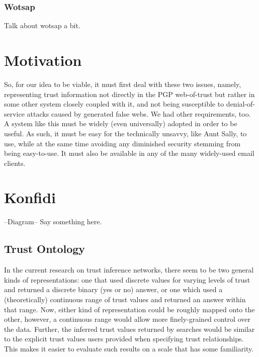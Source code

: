 \documentclass{acm_proc_article-sp}
\begin{document}
\subsubsection{Wotsap}
\label{wotsap}
Talk about wotsap a bit.

\section{Motivation}
So, for our idea to be viable, it must first deal with these two issues, namely, representing trust information not directly in the PGP web-of-trust but rather in some other system closely coupled with it, and not being susceptible to denial-of-service attacks caused by generated false webs. We had other requirements, too. A system like this must be widely (even universally) adopted in order to be useful. As such, it must be easy for the technically unsavvy, like Aunt Sally, to use, while at the same time avoiding any diminished security stemming from being easy-to-use. It must also be available in any of the many widely-used email clients. 

\section{Konfidi}
--Diagram--
Say something here.

\subsection{Trust Ontology}
In the current research on trust inference networks, there seem to be two general kinds of representations:  one that used discrete values for varying levels of trust and returned a discrete binary (yes or no) answer, or one which used a (theoretically) continuous range of trust values and returned an answer within that range.  Now, either kind of representation could be roughly mapped onto the other, however, a continuous range would allow more finely-grained control over the data.  Further, the inferred trust values returned by searches would be similar to the explicit trust values users provided when specifying trust relationships.  This makes it easier to evaluate such results on a scale that has some familiarity.
\end{document}
